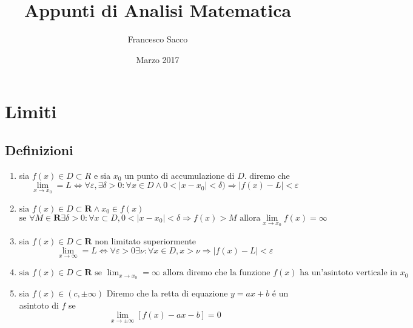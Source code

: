 \documentclass{exam}
\date{Marzo 2017}
\title{Appunti di Analisi Matematica}
\author{Francesco Sacco}
\begin{document}
\section{Limiti}
  \subsection{Definizioni}
    \begin{enumerate}
      \item 
        sia $f(x) \in D\subset R$ e sia $x_{0}$ un punto di accumulazione di $D$. diremo che
        \begin{displaymath}
          \lim_{x \to x_{0}}=L\Leftrightarrow \forall \varepsilon , \exists \delta > 0 :
          \forall x \in D \land 0<|x-x_{0}|< \delta) \Rightarrow |f(x)-L|<\varepsilon
        \end{displaymath}
      \item
        $\textrm{sia } f(x) \in D \subset \mathbf{R} \land x_{0}\in f(x) $
        \begin{displaymath}
          \textrm{se } \forall M \in \mathbf{R} \exists \delta >0: \forall x \subset D , 
          0<|x-x_{0}|<\delta \Rightarrow f(x)>M
          \textrm{ allora} \lim_{x \to x_{0}}f(x)=\infty
        \end{displaymath}
      \item 
        sia $f(x) \in D \subset \mathbf{R}$ non limitato superiormente
        \begin{displaymath}
          \lim_{x \to \infty}=L \Leftrightarrow 
          \forall \varepsilon>0 \exists \nu:\forall x\in D,
          x>\nu \Rightarrow |f(x)-L|<\varepsilon
        \end{displaymath}
      \item
        \(\displaystyle
          \textrm{sia } f(x) \in D\subset \mathbf{R}
          \textrm{ se }\lim_{x\to x_{0}}=\infty \textrm{ allora diremo che la funzione }f(x) 
          \textrm{ ha un'asintoto verticale in }x_{0}
        \)
      \item 
        sia $f(x)\in (c, \pm \infty)$ Diremo che la retta di equazione $y=ax+b$
        \'e un asintoto di $f$ se
          \begin{displaymath}
            \lim_{x\to \pm \infty}[f(x)-ax-b]=0
          \end{displaymath}
    \end{enumerate}
  
  
\end{document}
